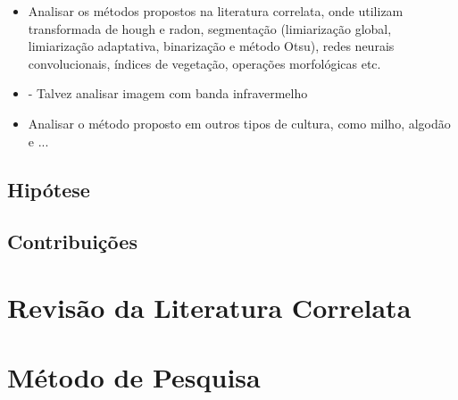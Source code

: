 \documentclass[12pt, a4paper, english, brazil]{article}
\begin{document}
\begin{itemize}
    \item Analisar os métodos propostos na literatura correlata, onde utilizam transformada de hough e radon, segmentação (limiarização global, limiarização adaptativa, binarização e método Otsu), redes neurais convolucionais, índices de vegetação, operações morfológicas etc.
    
    \item - Talvez analisar imagem com banda infravermelho
    \item Analisar o método proposto em outros tipos de cultura, como milho, algodão e ...
\end{itemize}

\subsection{Hipótese}

\subsection{Contribuições}

\section{Revisão da Literatura Correlata}

\section{Método de Pesquisa}
\end{document}
